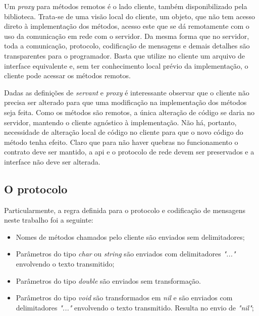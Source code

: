 \documentclass[11pt]{article}
\begin{document}
Um \textit{proxy} para métodos remotos é o lado cliente, também disponibilizado
pela biblioteca. Trata-se de uma visão local do cliente, um objeto, que não tem
acesso direto à implementação dos métodos, acesso este que se dá remotamente com
o uso da comunicação em rede com o servidor. Da mesma forma que no servidor,
toda a comunicação, protocolo, codificação de mensagens e demais detalhes são
transparentes para o programador. Basta que utilize no cliente um arquivo de
interface equivalente e, sem ter conhecimento local prévio da implementação, o
cliente pode acessar os métodos remotos.

Dadas as definições de \textit{servant} e \textit{proxy} é interessante observar
que o cliente não precisa ser alterado para que uma modificação na implementação
dos métodos seja feita. Como os métodos são remotos, a única alteração de código
se daria no servidor, mantendo o cliente agnóstico à implementação. Não há,
portanto, necessidade de alteração local de código no cliente para que o novo
código do método tenha efeito. Claro que para não haver quebras no funcionamento
o contrato deve ser mantido, a \gls{api} e o protocolo de rede devem ser
preservados e a interface não deve ser alterada.

\subsection{O protocolo}\label{subsec:proto}

Particularmente, a regra definida para o protocolo e codificação de mensagens
neste trabalho foi a seguinte:

\begin{itemize}
\item

    Nomes de métodos chamados pelo cliente são enviados sem delimitadores;

\item

    Parâmetros do tipo \textit{char} ou \textit{string} são enviados com
    delimitadores \textit{"..."} envolvendo o texto transmitido;

\item

    Parâmetros do tipo \textit{double} são enviados sem transformação.

\item

    Parâmetros do tipo \textit{void} são transformados em \textit{nil} e são
    enviados com delimitadores \textit{"..."} envolvendo o texto transmitido.
    Resulta no envio de \textit{"nil"};

\end{itemize}
\end{document}
